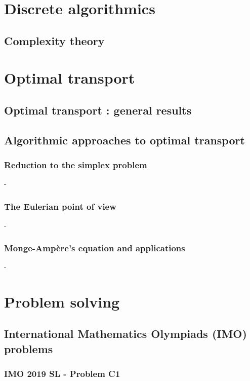 \documentclass[12pt,openany,oneside]{book}
\theoremstyle{definition}
\numberwithin{exercise}{section}
\numberwithin{definition}{section}
\numberwithin{theorem}{section}
\numberwithin{corollary}{section}
\numberwithin{proposition}{section}
\numberwithin{notation}{section}
\numberwithin{remark}{section}
\numberwithin{hypothesis}{section}
\numberwithin{example}{section}
\begin{document}
\part{Discrete algorithmics}

\chapter{Complexity theory}



\part{Optimal transport}

\chapter{Optimal transport : general  results}

\chapter{Algorithmic approaches to optimal transport}

\section{Reduction to the simplex problem}-
\section{The Eulerian point of view}-
\section{Monge-Ampère's equation and applications}-

\part{Problem solving}

\chapter{International Mathematics Olympiads (IMO) problems}

\section{IMO 2019 SL - Problem C1}

\end{document}
